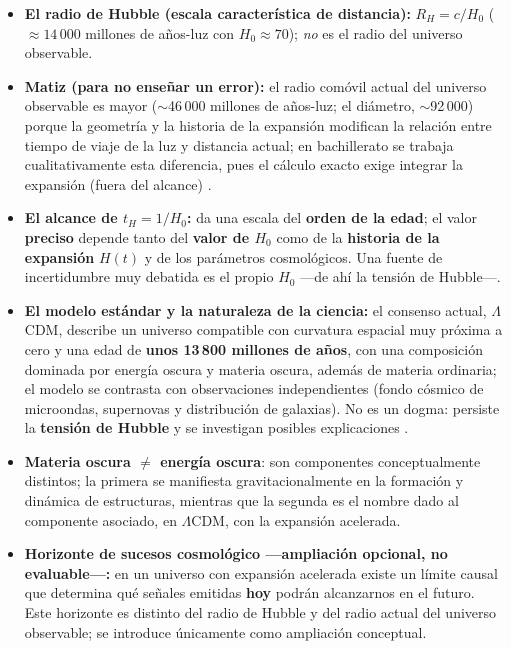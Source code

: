 \begin{itemize}
\item \textbf{El radio de Hubble (escala característica de distancia):} $R_H=c/H_{0}$ ($\approx 14\,000$ millones de años-luz con $H_{0} \approx 70$); \emph{no} es el radio del universo observable.
\item \textbf{Matiz (para no enseñar un error):} el radio comóvil actual del universo observable es mayor ($\sim$46\,000 millones de años-luz; el diámetro, $\sim$92\,000) porque la geometría y la historia de la expansión modifican la relación entre tiempo de viaje de la luz y distancia actual; en bachillerato se trabaja cualitativamente esta diferencia, pues el cálculo exacto exige integrar la expansión (fuera del alcance) \parencite{linton2012}.
\item \textbf{El alcance de $t_H=1/H_{0}$:} da una escala del \textbf{orden de la edad}; el valor \textbf{preciso} depende tanto del \textbf{valor de $H_{0}$} como de la \textbf{historia de la expansión} $H(t)$ y de los parámetros cosmológicos. Una fuente de incertidumbre muy debatida es el propio $H_{0}$ ---de ahí la tensión de Hubble---.
\item \textbf{El modelo estándar y la naturaleza de la ciencia:} el consenso actual, $\Lambda$CDM, describe un universo compatible con curvatura espacial muy próxima a cero y una edad de \textbf{unos 13\,800 millones de años}, con una composición dominada por energía oscura y materia oscura, además de materia ordinaria; el modelo se contrasta con observaciones independientes (fondo cósmico de microondas, supernovas y distribución de galaxias). No es un dogma: persiste la \textbf{tensión de Hubble} y se investigan posibles explicaciones \parencite{planck2020}.
\item \textbf{Materia oscura $\neq$ energía oscura}: son componentes conceptualmente distintos; la primera se manifiesta gravitacionalmente en la formación y dinámica de estructuras, mientras que la segunda es el nombre dado al componente asociado, en $\Lambda$CDM, con la expansión acelerada.
\item \textbf{Horizonte de sucesos cosmológico ---ampliación opcional, no evaluable---:} en un universo con expansión acelerada existe un límite causal que determina qué señales emitidas \textbf{hoy} podrán alcanzarnos en el futuro. Este horizonte es distinto del radio de Hubble y del radio actual del universo observable; se introduce únicamente como ampliación conceptual.
\end{itemize}

